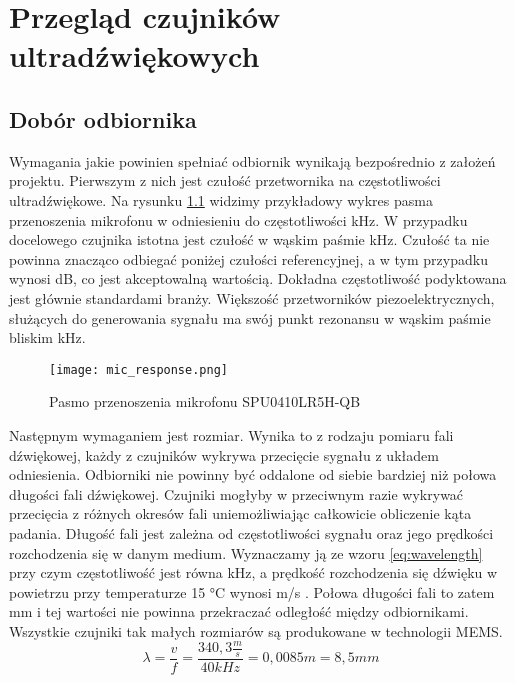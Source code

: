 \chapter[Przegląd czujników ultradźwiękowych]{Przegląd czujników ultradźwiękowych}

\label{chapter:przeglad_czujnikow}




\section{Dobór odbiornika}
Wymagania jakie powinien spełniać odbiornik wynikają bezpośrednio z założeń projektu. 
Pierwszym z nich jest czułość przetwornika na częstotliwości ultradźwiękowe. Na rysunku \ref{fig:mic_response} 
widzimy przykładowy wykres pasma przenoszenia mikrofonu w odniesieniu do częstotliwości \unit[1]{kHz}. 
W przypadku docelowego czujnika istotna jest czułość w wąskim paśmie \unit[40]{kHz}. 
Czułość ta nie powinna znacząco odbiegać poniżej czułości referencyjnej, a w tym przypadku wynosi \unit[-2]{dB}, co jest akceptowalną wartością.
Dokładna częstotliwość podyktowana jest głównie standardami branży. Większość przetworników piezoelektrycznych, 
służących do generowania sygnału ma swój punkt rezonansu w wąskim paśmie bliskim \unit[40]{kHz}.

\begin{figure}[ht!]
    \centering
    \texttt{[image: mic\_response.png]}
    \caption{Pasmo przenoszenia mikrofonu SPU0410LR5H-QB}
    \label{fig:mic_response}
\end{figure}
\vspace{2cm}
\noindent

Następnym wymaganiem jest rozmiar. 
Wynika to z rodzaju pomiaru fali dźwiękowej, każdy z czujników wykrywa przecięcie sygnału z układem odniesienia. 
Odbiorniki nie powinny być oddalone od siebie bardziej niż połowa długości fali dźwiękowej. 
Czujniki mogłyby w przeciwnym razie wykrywać przecięcia z różnych okresów fali uniemożliwiając całkowicie obliczenie kąta padania. 
Długość fali jest zależna od częstotliwości sygnału oraz jego prędkości rozchodzenia się w danym medium. 
Wyznaczamy ją ze wzoru \ref{eq:wavelength} przy czym częstotliwość jest równa \unit[40]{kHz},
a prędkość rozchodzenia się dźwięku w powietrzu przy temperaturze 15 °C wynosi \unit[340,3]{m/s} \cite{sound_speed}.
Połowa długości fali to zatem \unit[4,25]{mm} i tej wartości nie powinna przekraczać odległość między odbiornikami.
Wszystkie czujniki tak małych rozmiarów są produkowane w technologii MEMS. 
\begin{equation}
\lambda = \frac{v}{f} = \frac{340,3\frac{m}{s}}{40kHz}=0,0085m = 8,5mm
\label{eq:wavelength}    
\end{equation}

